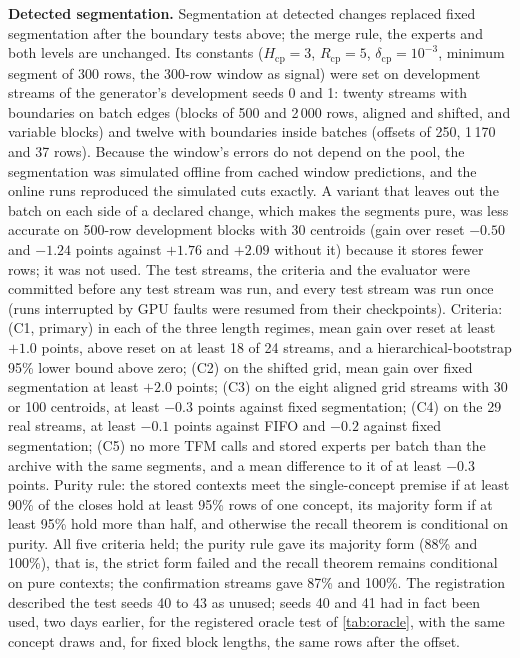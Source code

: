 \documentclass[11pt]{article}
\theoremstyle{plain}
\theoremstyle{definition}
\theoremstyle{remark}
\begin{document}
\textbf{Detected segmentation.} Segmentation at detected changes replaced fixed segmentation after the boundary
tests above; the merge rule, the experts and both levels are unchanged. Its constants ($H_{\mathrm{cp}}=3$,
$R_{\mathrm{cp}}=5$, $\delta_{\mathrm{cp}}=10^{-3}$, minimum segment of 300 rows, the 300-row window as signal) were set on
development streams of the generator's development seeds 0 and 1: twenty streams with boundaries on batch edges
(blocks of 500 and 2\,000 rows, aligned and shifted, and variable blocks) and twelve with boundaries inside batches
(offsets of 250, 1\,170 and 37 rows). Because the window's errors do not depend on the pool, the segmentation was
simulated offline from cached window predictions, and the online runs reproduced the simulated cuts exactly. A
variant that leaves out the batch on each side of a declared change, which makes the segments pure, was less
accurate on 500-row development blocks with 30 centroids (gain over reset $-0.50$ and $-1.24$ points against $+1.76$
and $+2.09$ without it) because it stores fewer rows; it was not used. The test streams, the criteria and the
evaluator were committed before any test stream was run, and every test stream was run once (runs interrupted by
GPU faults were resumed from their checkpoints). Criteria: (C1, primary) in each of the three length regimes, mean
gain over reset at least $+1.0$ points, above reset on at least 18 of 24 streams, and a hierarchical-bootstrap 95\%
lower bound above zero; (C2) on the shifted grid, mean gain over fixed segmentation at least $+2.0$ points; (C3) on
the eight aligned grid streams with 30 or 100 centroids, at least $-0.3$ points against fixed segmentation; (C4) on
the 29 real streams, at least $-0.1$ points against FIFO and $-0.2$ against fixed segmentation; (C5) no more TFM calls
and stored experts per batch than the archive with the same segments, and a mean difference to it of at least $-0.3$
points. Purity rule: the stored contexts meet the single-concept premise if at least 90\% of the closes hold at least
95\% rows of one concept, its majority form if at least 95\% hold more than half, and otherwise the recall theorem
is conditional on purity. All five criteria held; the purity rule gave its majority form (88\% and 100\%), that is, the strict form failed
and the recall theorem remains conditional on pure contexts; the confirmation streams gave 87\% and 100\%. The registration described the
test seeds 40 to 43 as unused; seeds 40 and 41 had in fact been used, two days earlier, for the registered oracle
test of \cref{tab:oracle}, with the same concept draws and, for fixed block lengths, the same rows after the offset.
\end{document}
